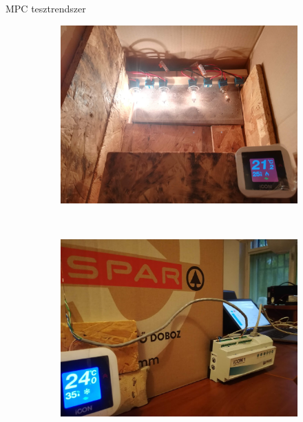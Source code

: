 \documentclass[14pt,handout]{beamer}
\begin{document}
\begin{frame}{MPC tesztrendszer}
\begin{figure}
	\begin{subfigure}[t]{0.45\textwidth}
		\centering
		\includegraphics[width=\textwidth]{picture/inside2.jpg}	
	\end{subfigure}
	~
	\begin{subfigure}[t]{0.45\textwidth}
		\centering
		\includegraphics[width=\textwidth]{picture/outside.jpg}	
	\end{subfigure}
\end{figure}

\end{frame}
\end{document}
